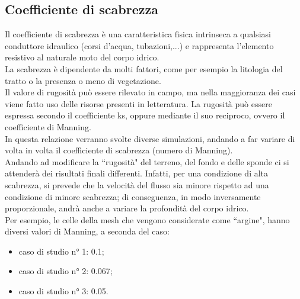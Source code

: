 \subsection{Coefficiente di scabrezza}
Il coefficiente di scabrezza è una caratteristica fisica intrinseca a qualsiasi conduttore idraulico (corsi d'acqua, tubazioni,...) e rappresenta l'elemento resistivo al naturale moto del corpo idrico.\\
La scabrezza è dipendente da molti fattori, come per esempio la litologia del tratto o la presenza o meno di vegetazione.\\
Il valore di rugosità può essere rilevato in campo, ma nella maggioranza dei casi viene fatto uso delle risorse presenti in letteratura. La rugosità può essere espressa secondo il coefficiente ks, oppure mediante il suo reciproco, ovvero il coefficiente di Manning.\\
In questa relazione verranno svolte diverse simulazioni, andando a far variare di volta in volta il coefficiente di scabrezza (numero di Manning).\\
Andando ad modificare la ``rugosità" del terreno, del fondo e delle sponde ci si attenderà dei risultati finali differenti. Infatti, per una condizione di alta scabrezza, si prevede che la velocità del flusso sia minore rispetto ad una condizione di minore scabrezza; di conseguenza, in modo inversamente proporzionale, andrà anche a variare la profondità del corpo idrico.\\
Per esempio, le celle della mesh che vengono considerate come ``argine", hanno diversi valori di Manning, a seconda del caso:
\begin{itemize}
    \item caso di studio n° 1: 0.1;
    \item caso di studio n° 2: 0.067;
    \item caso di studio n° 3: 0.05.
\end{itemize}

